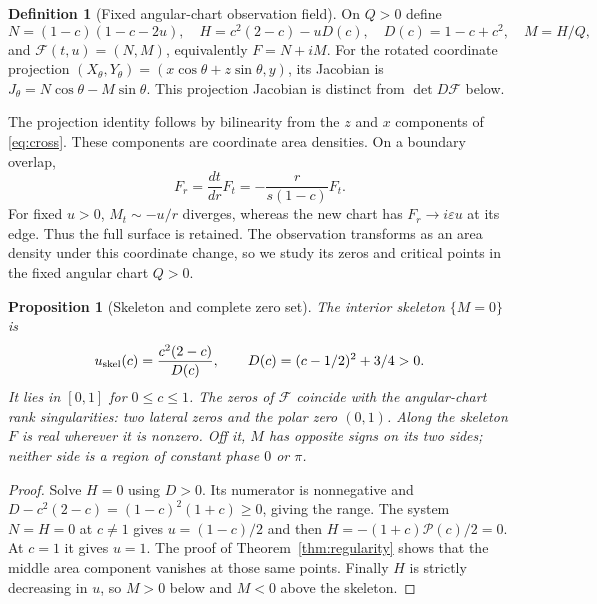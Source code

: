 \documentclass[11pt,a4paper]{article}
\newtheorem{proposition}[theorem]{Proposition}
\theoremstyle{definition}\newtheorem{definition}[theorem]{Definition}
\theoremstyle{remark}\newtheorem{remark}[theorem]{Remark}
\newcommand{\Map}{\mathcal F}\newcommand{\Pcore}{\mathcal P}
\begin{document}
\begin{definition}[Fixed angular-chart observation field]\label{def:observation}
On $Q>0$ define
\[
 N=(1-c)(1-c-2u),\quad H=c^2(2-c)-uD(c),\quad
 D(c)=1-c+c^2,\quad M=H/Q,
\]
and $\Map(t,u)=(N,M)$, equivalently $F=N+iM$.
For the rotated coordinate projection $(X_\theta,Y_\theta)
=(x\cos\theta+z\sin\theta,y)$, its Jacobian is
$J_\theta=N\cos\theta-M\sin\theta$.
This projection Jacobian is distinct from $\det D\Map$ below.
\end{definition}
The projection identity follows by bilinearity from the $z$ and $x$
components of \eqref{eq:cross}. These components are coordinate area
densities. On a boundary overlap,
\begin{equation}\label{eq:field-transform}
 F_r=\frac{dt}{dr}F_t=-\frac{r}{s(1-c)}F_t.
\end{equation}
For fixed $u>0$, $M_t\sim-u/r$ diverges, whereas the new chart has
$F_r\longrightarrow i\varepsilon u$ at its edge. Thus the full surface
is retained. The observation transforms as an area density under this
coordinate change, so we study its zeros and critical points in the fixed
angular chart $Q>0$.

\begin{proposition}[Skeleton and complete zero set]\label{prop:zeros}
The interior skeleton $\{M=0\}$ is
\[
 u_{\rm skel}(c)=\frac{c^2(2-c)}{D(c)},\qquad
 D(c)=(c-1/2)^2+3/4>0.
\]
It lies in $[0,1]$ for $0\leq c\leq1$. The zeros of $\Map$ coincide
with the angular-chart rank singularities: two lateral zeros and the
polar zero $(0,1)$. Along the skeleton $F$ is real wherever it is
nonzero. Off it, $M$ has opposite signs on its two sides; neither side
is a region of constant phase $0$ or $\pi$.
\end{proposition}
\begin{proof}
Solve $H=0$ using $D>0$. Its numerator is nonnegative and
$D-c^2(2-c)=(1-c)^2(1+c)\geq0$, giving the range.
The system $N=H=0$ at $c\ne1$ gives $u=(1-c)/2$ and then
$H=-(1+c)\Pcore(c)/2=0$. At $c=1$ it gives $u=1$.
The proof of Theorem~\ref{thm:regularity} shows that the middle area
component vanishes at those same points. Finally $H$ is strictly
decreasing in $u$, so $M>0$ below and $M<0$ above the skeleton.
\end{proof}
\end{document}
